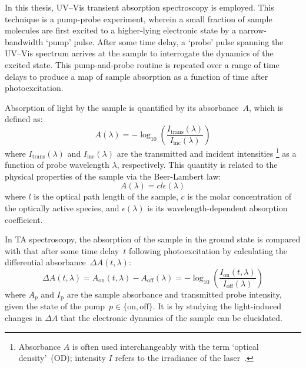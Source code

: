 In this thesis, UV--Vis transient absorption spectroscopy is employed.
This technique is a pump-probe experiment,
wherein a small fraction of sample molecules are first excited
to a higher-lying electronic state by a narrow-bandwidth `pump' pulse.
After some time delay, a `probe' pulse spanning the UV--Vis spectrum arrives at the sample
to interrogate the dynamics of the excited state.
This pump-and-probe routine is repeated over a range of time delays
to produce a map of sample absorption as a function of time after photoexcitation.

Absorption of light by the sample is quantified by its absorbance~$A$,
which is defined as:
%
\begin{equation}
  A(\lambda) = -\log_{10} \left(  \frac{I_\text{trans}(\lambda)}{I_\text{inc}(\lambda)} \right)
\end{equation}
%
where $I_\text{trans}(\lambda)$ and $I_\text{inc}(\lambda)$
are the transmitted and incident intensities%
\footnote{Absorbance $A$ is often used interchangeably with the term
`optical density'~(OD); intensity $I$ refers to the irradiance of the laser~\cite{ISO9288}.}
as a function of probe wavelength $\lambda$, respectively. This quantity is related to
the physical properties of the sample via the Beer-Lambert law:
%
\begin{equation}
  A(\lambda) = c l \epsilon(\lambda)
\end{equation}
%
where $l$ is the optical path length of the sample,
$c$ is the molar concentration of the optically active species,
and $\epsilon (\lambda)$ is its wavelength-dependent absorption coefficient.

In TA spectroscopy, the absorption of the sample in the ground state is compared
with that after some time delay~$t$ following photoexcitation
by calculating the differential absorbance~$\Delta A(t, \lambda)$:
%
\begin{equation}
  \Delta A(t, \lambda) = A_\text{on}(t, \lambda) - A_\text{off}(\lambda) = -\log_{10} \left( \frac{I_\text{on}(t, \lambda)}{I_\text{off}(\lambda)} \right)
\end{equation}
%
where $A_p$ and $I_\text{p}$ are the sample absorbance and transmitted probe intensity,
given the state of the pump~$p \in \{ \text{on}, \text{off} \}$.
It is by studying the light-induced changes in $\Delta A$ that the electronic dynamics of the sample
can be elucidated.

